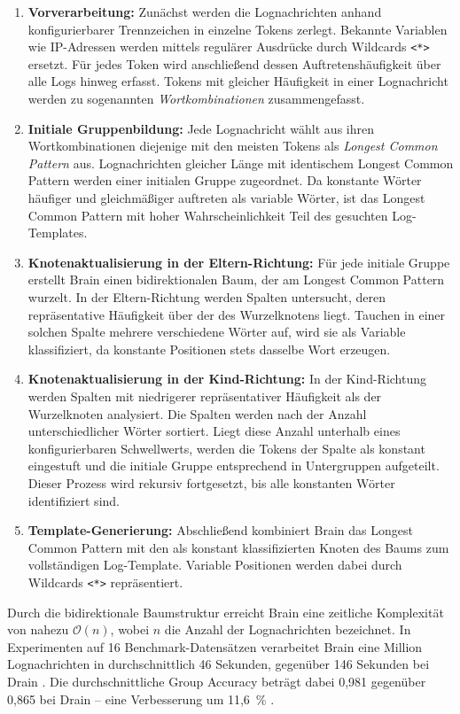 \begin{enumerate}
    \item \textbf{Vorverarbeitung:} Zunächst werden die Lognachrichten anhand 
    konfigurierbarer Trennzeichen in einzelne Tokens zerlegt. Bekannte Variablen 
    wie IP-Adressen werden mittels regulärer Ausdrücke durch Wildcards 
    \texttt{<*>} ersetzt. Für jedes Token wird anschließend dessen 
    Auftretenshäufigkeit über alle Logs hinweg erfasst. Tokens mit gleicher 
    Häufigkeit in einer Lognachricht werden zu sogenannten \textit{Wortkombinationen} 
    zusammengefasst.

    \item \textbf{Initiale Gruppenbildung:} Jede Lognachricht wählt aus ihren 
    Wortkombinationen diejenige mit den meisten Tokens als \textit{Longest Common 
    Pattern} aus. Lognachrichten gleicher Länge mit identischem Longest Common 
    Pattern werden einer initialen Gruppe zugeordnet. Da konstante Wörter 
    häufiger und gleichmäßiger auftreten als variable Wörter, ist das Longest 
    Common Pattern mit hoher Wahrscheinlichkeit Teil des gesuchten Log-Templates.

    \item \textbf{Knotenaktualisierung in der Eltern-Richtung:} Für jede initiale 
    Gruppe erstellt Brain einen bidirektionalen Baum, der am Longest Common 
    Pattern wurzelt. In der Eltern-Richtung werden Spalten untersucht, deren 
    repräsentative Häufigkeit über der des Wurzelknotens liegt. Tauchen in einer 
    solchen Spalte mehrere verschiedene Wörter auf, wird sie als Variable 
    klassifiziert, da konstante Positionen stets dasselbe Wort erzeugen.

    \item \textbf{Knotenaktualisierung in der Kind-Richtung:} In der 
    Kind-Richtung werden Spalten mit niedrigerer repräsentativer Häufigkeit 
    als der Wurzelknoten analysiert. Die Spalten werden nach der Anzahl 
    unterschiedlicher Wörter sortiert. Liegt diese Anzahl unterhalb eines 
    konfigurierbaren Schwellwerts, werden die Tokens der Spalte als konstant 
    eingestuft und die initiale Gruppe entsprechend in Untergruppen aufgeteilt. 
    Dieser Prozess wird rekursiv fortgesetzt, bis alle konstanten Wörter 
    identifiziert sind.

    \item \textbf{Template-Generierung:} Abschließend kombiniert Brain das 
    Longest Common Pattern mit den als konstant klassifizierten Knoten des 
    Baums zum vollständigen Log-Template. Variable Positionen werden dabei durch 
    Wildcards \texttt{<*>} repräsentiert.
\end{enumerate}

Durch die bidirektionale Baumstruktur erreicht Brain eine zeitliche Komplexität
von nahezu $\mathcal{O}(n)$, wobei $n$ die Anzahl der Lognachrichten bezeichnet.
In Experimenten auf 16 Benchmark-Datensätzen verarbeitet Brain eine Million
Lognachrichten in durchschnittlich 46 Sekunden, gegenüber 146 Sekunden bei
Drain \cite{brain}. Die durchschnittliche Group Accuracy beträgt dabei 0,981
gegenüber 0,865 bei Drain – eine Verbesserung um 11,6~\% \cite{brain}.